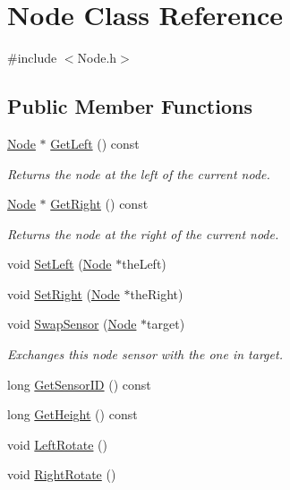 \hypertarget{classNode}{\section{Node Class Reference}
\label{classNode}
}


{\ttfamily \#include $<$Node.\-h$>$}

\subsection*{Public Member Functions}
\begin{DoxyCompactItemize}
\item 
\hyperlink{classNode}{Node} $\ast$ \hyperlink{classNode_a8be3d1ff2d2c047109046f483cf63b9c}{Get\-Left} () const 
\begin{DoxyCompactList}\small\item\em Returns the node at the left of the current node. \end{DoxyCompactList}\item 
\hyperlink{classNode}{Node} $\ast$ \hyperlink{classNode_a0cc2265abc17992234448da2cad41458}{Get\-Right} () const 
\begin{DoxyCompactList}\small\item\em Returns the node at the right of the current node. \end{DoxyCompactList}\item 
void \hyperlink{classNode_a0cbc1e13324f2694f59b1bfe6533fcde}{Set\-Left} (\hyperlink{classNode}{Node} $\ast$the\-Left)
\item 
void \hyperlink{classNode_a59565f31a029b056a78ee1f05b4c6276}{Set\-Right} (\hyperlink{classNode}{Node} $\ast$the\-Right)
\item 
void \hyperlink{classNode_a9879ed4992f498abe4a4b9e26d107b34}{Swap\-Sensor} (\hyperlink{classNode}{Node} $\ast$target)
\begin{DoxyCompactList}\small\item\em Exchanges this node sensor with the one in target. \end{DoxyCompactList}\item 
long \hyperlink{classNode_adc4f38a37801ca7e950bb60d81af79bb}{Get\-Sensor\-I\-D} () const 
\item 
long \hyperlink{classNode_a1719f607624e624d2a549e8fee069840}{Get\-Height} () const 
\item 
void \hyperlink{classNode_a553cc574070fa1fe8f8c7f732171bfd6}{Left\-Rotate} ()
\item 
void \hyperlink{classNode_a5a0f842669726a8f2382e3ed85bbf353}{Right\-Rotate} ()

\end{DoxyCompactItemize}
